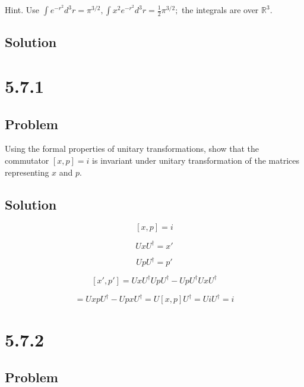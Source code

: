 \documentclass[12pt]{article}
\begin{document}
Hint. Use \(\int e^{-r^2} d^3 r=\pi^{3 / 2}, \int x^2 e^{-r^2} d^3 r=\frac{1}{2} \pi^{3 / 2} ;\) the integrals are over \(\mathbb{R}^3\).

\subsection{Solution}



\newpage
\section{5.7.1}

\subsection{Problem}

Using the formal properties of unitary transformations, show that the commutator \([x, p]=i\) is invariant under unitary transformation of the matrices representing \(x\) and \(p\).

\subsection{Solution}

\[
    [x, p] = i
\]

\[
    U x U^\dagger = x'
\]

\[
    U p U^\dagger = p'
\]

\[
    [x', p'] =U x U^\dagger U p U^\dagger - U p U^\dagger U x U^\dagger
\]

\[
    = U x p U^\dagger - U p x U^\dagger = U [x, p] U^\dagger = U i U^\dagger = i
\]

\newpage
\section{5.7.2}

\subsection{Problem}
\end{document}
